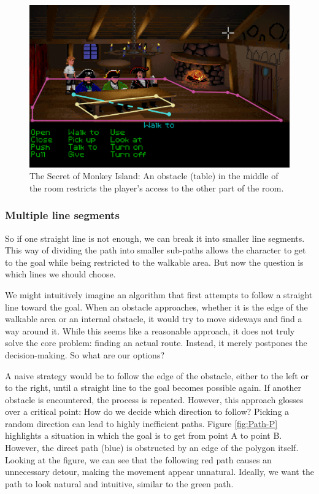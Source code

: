 \begin{figure}[H]
\centering
\includegraphics[width=.7\linewidth]{img/Path-TSoMI2.png}
\caption{The Secret of Monkey Island: An obstacle (table) in the middle of the room restricts the player's access to the other part of the room.}
\label{fig:Path-M}
\end{figure}

\subsubsection{Multiple line segments}
So if one straight line is not enough, we can break it into smaller line segments. This way of dividing the path into smaller sub-paths allows the character to get to the goal while being restricted to the walkable area. But now the question is which lines we should choose.

We might intuitively imagine an algorithm that first attempts to follow a straight line toward the goal. When an obstacle approaches, whether it is the edge of the walkable area or an internal obstacle, it would try to move sideways and find a way around it. While this seems like a reasonable approach, it does not truly solve the core problem: finding an actual route. Instead, it merely postpones the decision-making. So what are our options?

A naive strategy would be to follow the edge of the obstacle, either to the left or to the right, until a straight line to the goal becomes possible again. If another obstacle is encountered, the process is repeated. However, this approach glosses over a critical point: How do we decide which direction to follow? Picking a random direction can lead to highly inefficient paths. Figure \ref{fig:Path-P} highlights a situation in which the goal is to get from point A to point B. However, the direct path (blue) is obstructed by an edge of the polygon itself. Looking at the figure, we can see that the following red path causes an unnecessary detour, making the movement appear unnatural. Ideally, we want the path to look natural and intuitive, similar to the green path.

